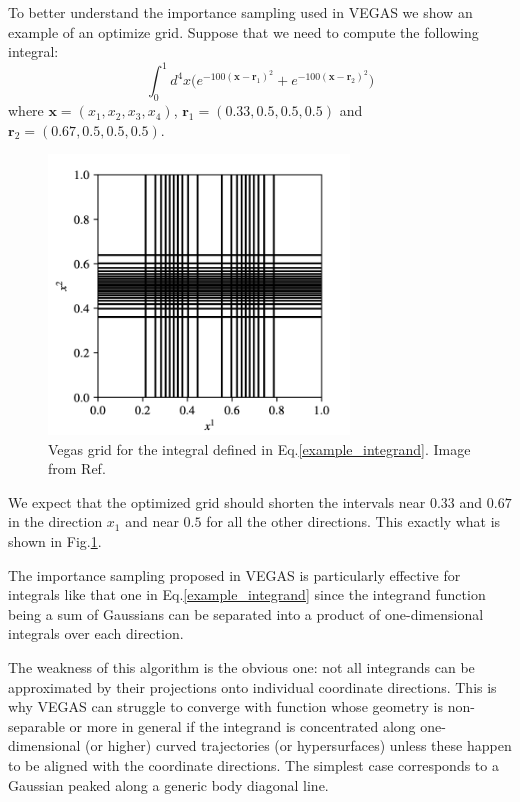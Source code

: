 \documentclass[../main/main.tex]{subfiles}
\begin{document}
To better understand the importance sampling used in VEGAS we show an example of an optimize grid.
Suppose that we need to compute the following integral:
\begin{equation}
	\label{example_integrand}
	\int_0^1 d^4 x \big(e^{-100(\textbf{x}- \textbf{r}_1)^2} + e^{-100(\textbf{x}- \textbf{r}_2)^2} \big)
\end{equation}
where $\textbf{x} = (x_1, x_2, x_3, x_4)$, $\textbf{r}_1 = (0.33, 0.5, 0.5, 0.5)$ and $\textbf{r}_2 = (0.67, 0.5, 0.5, 0.5)$.
\begin{figure}
	\centering
	\includegraphics[width=8cm]{../images/vegas_grid.png}
	\caption{Vegas grid for the integral defined in Eq.\eqref{example_integrand}. Image from Ref\cite{Lepage:2020tgj}.}
	\label{vegas_grid}
\end{figure}
We expect that the optimized grid should shorten the intervals near $0.33$ and $0.67$ in the direction $x_1$ and near $0.5$ for all the 
other directions. This exactly what is shown in Fig.\ref{vegas_grid}.

The importance sampling proposed in VEGAS is particularly effective for integrals like that one in Eq.\eqref{example_integrand} since the integrand function being a sum of Gaussians can be separated into a product of one-dimensional integrals over each direction.

The weakness of this algorithm is the obvious one: not all integrands can be approximated by their projections onto individual coordinate
directions. This is why VEGAS can struggle to converge with function whose geometry is non-separable or more in general if the integrand
is concentrated along one-dimensional (or higher) curved trajectories (or hypersurfaces) unless these happen to be aligned with the coordinate directions. The simplest case corresponds to a Gaussian peaked along a generic body diagonal line.
\end{document}
